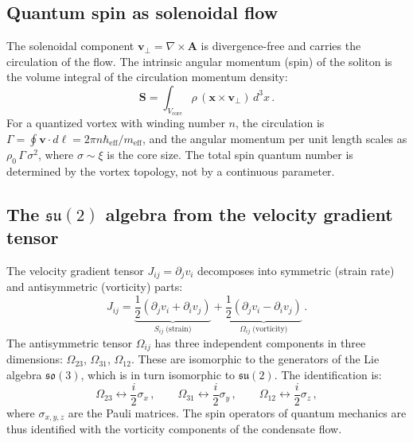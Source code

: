 \documentclass[12pt, a4paper]{article}
\newcommand{\meff}{m_{\mathrm{eff}}}
\newcommand{\heff}{\hbar_{\mathrm{eff}}}
\begin{document}
\subsection{Quantum spin as solenoidal flow}

The solenoidal component
$\mathbf{v}_\perp = \nabla\times\mathbf{A}$ is
divergence-free and carries the circulation of the
flow. The intrinsic angular momentum (spin) of the
soliton is the volume integral of the circulation
momentum density:
\begin{equation}
    \mathbf{S} = \int_{V_{\mathrm{core}}}
    \rho\,(\mathbf{x}\times\mathbf{v}_\perp)\,d^3x\,.
\label{eq:spin}
\end{equation}
For a quantized vortex with winding number $n$, the
circulation is $\Gamma = \oint\mathbf{v}\cdot
d\boldsymbol{\ell} = 2\pi n\heff/\meff$, and the
angular momentum per unit length scales as
$\rho_0\,\Gamma\,\sigma^2$, where $\sigma \sim \xi$
is the core size. The total spin quantum number is
determined by the vortex topology, not by a
continuous parameter.

\subsection{The \texorpdfstring{$\mathfrak{su}(2)$}{su(2)}
algebra from the velocity gradient tensor}

The velocity gradient tensor
$J_{ij} = \partial_j v_i$ decomposes into symmetric
(strain rate) and antisymmetric (vorticity) parts:
\begin{equation}
    J_{ij} = \underbrace{\frac{1}{2}(\partial_j v_i
    + \partial_i v_j)}_{S_{ij}\;\text{(strain)}}
    + \underbrace{\frac{1}{2}(\partial_j v_i
    - \partial_i v_j)}_{\Omega_{ij}\;\text{(vorticity)}}\,.
\label{eq:J_decomp}
\end{equation}
The antisymmetric tensor $\Omega_{ij}$ has three
independent components in three dimensions:
$\Omega_{23}$, $\Omega_{31}$, $\Omega_{12}$. These
are isomorphic to the generators of the Lie algebra
$\mathfrak{so}(3)$, which is in turn isomorphic to
$\mathfrak{su}(2)$. The identification is:
\begin{equation}
    \Omega_{23} \leftrightarrow \frac{i}{2}\sigma_x\,,
    \qquad
    \Omega_{31} \leftrightarrow \frac{i}{2}\sigma_y\,,
    \qquad
    \Omega_{12} \leftrightarrow \frac{i}{2}\sigma_z\,,
\label{eq:pauli_map}
\end{equation}
where $\sigma_{x,y,z}$ are the Pauli matrices. The
spin operators of quantum mechanics are thus
identified with the vorticity components of the
condensate flow.
\end{document}
